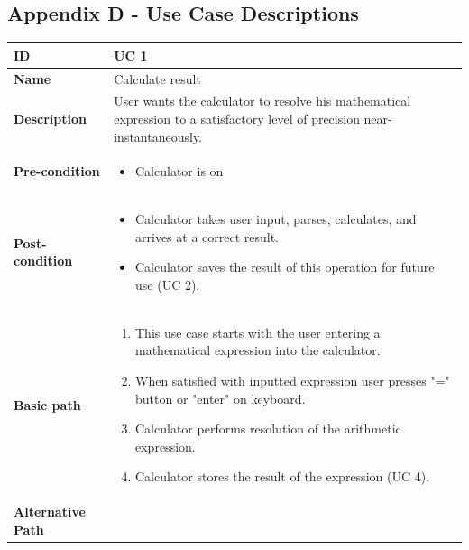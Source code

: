 \documentclass[a4paper]{article}
\begin{document}
\subsection{Appendix D - Use Case Descriptions}

\begin{table}[!h]
\begin{tabular}{|p{3cm}|p{9cm}|}
\hline
\textbf{ID} & UC 1  \\ \hline
\textbf{Name} & Calculate result  \\ \hline
\textbf{Description} & User wants the calculator to resolve his mathematical expression to a satisfactory level of precision near-instantaneously.  \\ \hline
\textbf{Pre-condition} &
	\begin{itemize}
		\vspace{-2mm}
		\item Calculator is on
		\vspace{-3.5mm}
	\end{itemize}  \\ \hline
\textbf{Post-condition} &
	\begin{itemize}
		\vspace{-2mm}
		\item Calculator takes user input, parses, calculates, and arrives at a correct result.
		\item Calculator saves the result of this operation for future use (UC 2).
		\vspace{-3.5mm}
	\end{itemize}  \\ \hline
\textbf{Basic path} &
	\begin{enumerate}
		\vspace{-2mm}
		\item This use case starts with the user entering a mathematical expression into the calculator.
		\item When satisfied with inputted expression user presses "=" button or "enter" on keyboard.
		\item Calculator performs resolution of the arithmetic expression.
		\item Calculator stores the result of the expression (UC 4).
		\vspace{-3.5mm}
	\end{enumerate}  \\ \hline
\textbf{Alternative Path} &
	\begin{itemize}[leftmargin=6mm]
		\vspace{-2mm}

\end{itemize}
\end{tabular}
\end{table}
\end{document}

